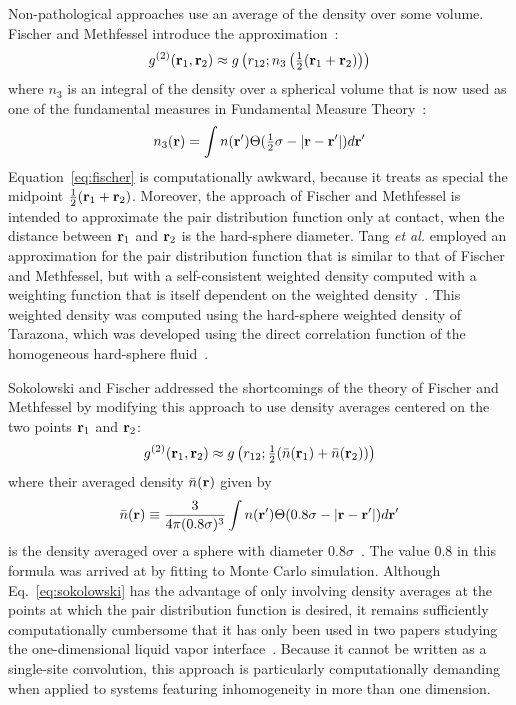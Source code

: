 Non-pathological approaches use an average of the density over some
volume. Fischer and Methfessel introduce the
approximation~\cite{fischer1980born,harris1987comment}:
\begin{align}
  g^{(2)}(\textbf{r}_1,\textbf{r}_2) \approx g\left(r_{12}; n_3\left(\tfrac12
  (\textbf{r}_1+\textbf{r}_2)\right)\right)
  \label{eq:fischer}
\end{align}
where $n_3$ is an integral of the density over a spherical volume that
is now used as one of the fundamental measures in Fundamental
Measure Theory~\cite{rosenfeld1989free}:
\begin{align}
  n_3(\textbf{r}) = \int n(\textbf{r}')\Theta(\tfrac12 \sigma - |\textbf{r}-\textbf{r}'|) d\textbf{r}'
\end{align}
Equation~\ref{eq:fischer} is computationally awkward, because it
treats as special the midpoint $\tfrac12(\textbf{r}_1+\textbf{r}_2)$.  Moreover, the
approach of Fischer and Methfessel is intended to approximate the pair
distribution function only at contact, when the distance between
$\textbf{r}_1$ and $\textbf{r}_2$ is the hard-sphere diameter.
%
Tang \emph{et al.} employed an approximation for the pair distribution
function that is similar to that of Fischer and Methfessel, but with a
self-consistent weighted density computed with a weighting function that
is itself dependent on the weighted density~\cite{tang1991density}.
This weighted density was computed using the hard-sphere weighted
density of Tarazona, which was developed using the direct correlation
function of the homogeneous hard-sphere fluid~\cite{tarazona1985free}.

Sokolowski and Fischer addressed the shortcomings of the theory of
Fischer and Methfessel by modifying this approach to use density
averages centered on the two points $\textbf{r}_1$ and $\textbf{r}_2$:
\begin{align}
  g^{(2)}(\textbf{r}_1,\textbf{r}_2) \approx g\left(r_{12};
  \tfrac12(\bar{n}(\textbf{r}_1)+\bar{n}(\textbf{r}_2))\right)
  \label{eq:sokolowski}
\end{align}
where their averaged density $\bar{n}(\textbf{r})$ given by
\begin{align}
  \bar{n}(\textbf{r}) \equiv \frac{3}{4\pi (0.8\sigma)^3}\int n(\textbf{r}')\Theta(0.8\sigma - |\textbf{r}-\textbf{r}'|) d\textbf{r}'
\end{align}
is the density averaged over a sphere with diameter
$0.8\sigma$~\cite{sokolowski1992role}.  The value 0.8 in this formula
was arrived at by fitting to Monte Carlo simulation.  Although
Eq.~\ref{eq:sokolowski} has the advantage of only involving
density averages at the points at which the pair distribution function
is desired, it remains sufficiently computationally cumbersome that it
has only been used in two papers studying the one-dimensional liquid vapor
interface~\cite{wadewitz2000application, winkelmann2001liquid}.
Because it cannot be written as a single-site convolution, this
approach is particularly computationally demanding when applied to
systems featuring inhomogeneity in more than one dimension.

